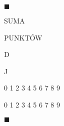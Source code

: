 \documentclass[a4paper,12pt]{article}
\begin{document}
$\blacksquare$

SUMA

PUNKTÓW

D \square  \square  \square  \square  \square  \square  \square  \square  \square  \square 

J

0 1 2 3 4 5 6 7 8 9

0 1 2 3 4 5 6 7 8 9

$\blacksquare$
\end{document}
